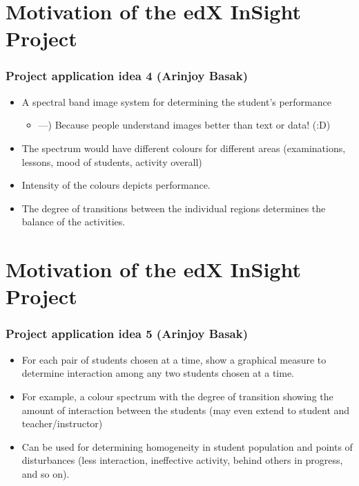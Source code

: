 \documentclass[12pt,xcolor=dvipsnames]{beamer}
\begin{document}
\section{Motivation of the edX InSight Project}
\begin{frame}[t]
\frametitle{Project application idea 4 (Arinjoy Basak)}

\begin{itemize}
\item A spectral band image system for determining the student's performance

\begin{itemize}
\item ---) Because people understand images better than text or data! (:D)
\end{itemize}

\item The spectrum would have different colours for different areas (examinations, lessons, mood of students, activity overall)
\item Intensity of the colours depicts performance.
\item The degree of transitions between the individual regions determines the balance of the activities.

\end{itemize}
\end{frame}

\section{Motivation of the edX InSight Project}
\begin{frame}[t]
\frametitle{Project application idea 5 (Arinjoy Basak)}

\begin{itemize}
\item For each pair of students chosen at a time, show a graphical measure to determine interaction among any two students chosen at a time.
\item For example, a colour spectrum with the degree of transition showing the amount of interaction between the students (may even extend to student and teacher/instructor)
\item Can be used for determining homogeneity in student population and points of disturbances (less interaction, ineffective activity, behind others in progress, and so on).

\end{itemize}
\end{frame}
\end{document}
